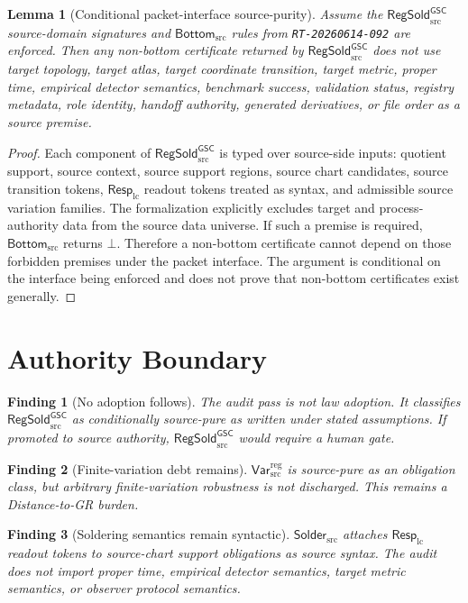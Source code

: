 \documentclass[11pt]{article}
\newcommand{\RespLC}{\mathsf{Resp}_{\mathrm{lc}}}
\newcommand{\RegSold}{\mathsf{RegSold}_{\mathrm{src}}^{\mathsf{GSC}}}
\newcommand{\SolderSrc}{\mathsf{Solder}_{\mathrm{src}}}
\newcommand{\VarRegSrc}{\mathsf{Var}^{\mathrm{reg}}_{\mathrm{src}}}
\newcommand{\BottomSrc}{\mathsf{Bottom}_{\mathrm{src}}}
\newcommand{\Bot}{\bot}
\newtheorem{finding}{Finding}
\newtheorem{lemma}{Lemma}
\begin{document}
\begin{lemma}[Conditional packet-interface source-purity]
Assume the \(\RegSold\) source-domain signatures and \(\BottomSrc\) rules from
\texttt{RT-20260614-092} are enforced. Then any non-bottom certificate
returned by \(\RegSold\) does not use target topology, target atlas, target
coordinate transition, target metric, proper time, empirical detector
semantics, benchmark success, validation status, registry metadata, role
identity, handoff authority, generated derivatives, or file order as a source
premise.
\end{lemma}

\begin{proof}
Each component of \(\RegSold\) is typed over source-side inputs: quotient
support, source context, source support regions, source chart candidates,
source transition tokens, \(\RespLC\) readout tokens treated as syntax, and
admissible source variation families. The formalization explicitly excludes
target and process-authority data from the source data universe. If such a
premise is required, \(\BottomSrc\) returns \(\Bot\). Therefore a non-bottom
certificate cannot depend on those forbidden premises under the packet
interface. The argument is conditional on the interface being enforced and
does not prove that non-bottom certificates exist generally.
\end{proof}

\section{Authority Boundary}

\begin{finding}[No adoption follows]
The audit pass is not law adoption. It classifies \(\RegSold\) as
conditionally source-pure as written under stated assumptions. If promoted to
source authority, \(\RegSold\) would require a human gate.
\end{finding}

\begin{finding}[Finite-variation debt remains]
\(\VarRegSrc\) is source-pure as an obligation class, but arbitrary
finite-variation robustness is not discharged. This remains a Distance-to-GR
burden.
\end{finding}

\begin{finding}[Soldering semantics remain syntactic]
\(\SolderSrc\) attaches \(\RespLC\) readout tokens to source-chart support
obligations as source syntax. The audit does not import proper time, empirical
detector semantics, target metric semantics, or observer protocol semantics.
\end{finding}
\end{document}
